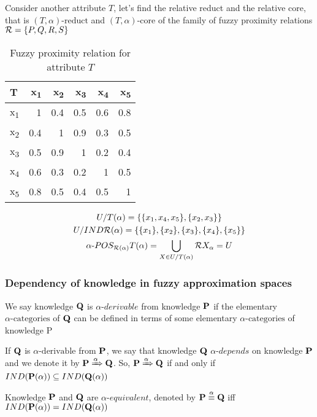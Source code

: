 \documentclass[11pt]{article}
\begin{document}
Consider another attribute \(T\), let's find the relative reduct and the
relative core, that is \((T,\alpha)\text{-reduct}\) and
\((T,\alpha)\text{-core}\) of the family of fuzzy proximity relations 
\(\mathcal{R}=\left\{ P,Q,R,S\right\}\)
\begin{table}[htbp]
\caption{Fuzzy proximity relation for attribute \(T\)}
\centering
\begin{tabular}{lrrrrr}
\hline
T & x\textsubscript{1} & x\textsubscript{2} & x\textsubscript{3} & x\textsubscript{4} & x\textsubscript{5}\\
\hline
x\textsubscript{1} & 1 & 0.4 & 0.5 & 0.6 & 0.8\\
x\textsubscript{2} & 0.4 & 1 & 0.9 & 0.3 & 0.5\\
x\textsubscript{3} & 0.5 & 0.9 & 1 & 0.2 & 0.4\\
x\textsubscript{4} & 0.6 & 0.3 & 0.2 & 1 & 0.5\\
x\textsubscript{5} & 0.8 & 0.5 & 0.4 & 0.5 & 1\\
\hline
\end{tabular}
\end{table}
\begin{gather*}
  U/T(\alpha)=\{\{x_1,x_4,x_5\},\{x_2,x_3\}\}\\
  U/IND\mathcal{R}(\alpha)=\{\{x_1\},\{x_2\},\{x_3\},\{x_4\},\{x_5\}\}\\
  \alpha\text{-}POS_{\mathcal{R}(\alpha)}T(\alpha)=
  \displaystyle\bigcup_{X\in U/T(\alpha)}\mathcal{R} X_\alpha=U
\end{gather*}
\subsubsection{Dependency of knowledge in fuzzy approximation spaces}
\label{sec:orgfaa58c6}
\begin{definition}[]
We say knowledge \(\operatorname{\textbf{Q}}\) is \(\alpha\textit{-derivable}\) from knowledge \(\operatorname{\textbf{P}}\) if
the elementary \(\alpha\text{-categories}\) of \(\operatorname{\textbf{Q}}\) can be defined in terms
of some elementary \(\alpha\text{-categories}\) of knowledge P
\end{definition}
\begin{definition}[]
If \(\operatorname{\textbf{Q}}\) is \(\alpha\text{-derivable}\) from \(\operatorname{\textbf{P}}\), we say that knowledge \(\operatorname{\textbf{Q}}\)
\(\alpha\textit{-depends}\) on knowledge \(\operatorname{\textbf{P}}\) and we denote it by
\(\operatorname{\textbf{P}}\xRightarrow{\alpha}\operatorname{\textbf{Q}}\). So, \(\operatorname{\textbf{P}}\xRightarrow{\alpha}\operatorname{\textbf{Q}}\) if and only
if \(IND(\operatorname{\textbf{P}}(\alpha))\subseteq IND(\operatorname{\textbf{Q}}(\alpha))\)
\end{definition}
\begin{definition}[]
Knowledge \(\operatorname{\textbf{P}}\) and \(\operatorname{\textbf{Q}}\) are \(\alpha\textit{-equivalent}\), denoted by 
\(\operatorname{\textbf{P}}\stackrel{\alpha}{\equiv}\operatorname{\textbf{Q}}\) iff \(IND(\operatorname{\textbf{P}}(\alpha))=IND(\operatorname{\textbf{Q}}(\alpha))\)
\end{definition}
\end{document}
